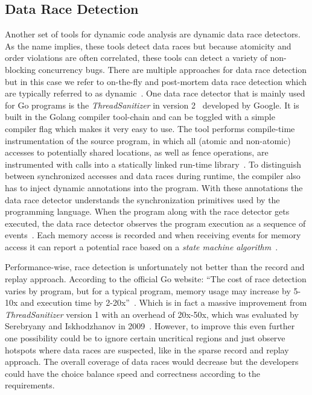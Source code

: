 \documentclass[conference]{IEEEtran}
\begin{document}
\subsection{Data Race Detection}
Another set of tools for dynamic code analysis are dynamic data race detectors.
As the name implies, these tools detect data races but because atomicity and order violations are often correlated, these tools can detect a variety of non-blocking concurrency bugs.
There are multiple approaches for data race detection but in this case we refer to on-the-fly and post-mortem data race detection which are typically referred to as dynamic~\cite{serebry2009threadsanitizer}.
One data race detector that is mainly used for Go programs is the \emph{ThreadSanitizer} in version 2~\cite{threadSanitizer} developed by Google.
It is built in the Golang compiler tool-chain and can be toggled with a simple compiler flag which makes it very easy to use.
The tool performs compile-time instrumentation of the source program, in which all (atomic and non-atomic) accesses to potentially shared locations, as well as fence operations, are instrumented with calls into a statically linked run-time library~\cite{lidbury2019sparse}.
To distinguish between synchronized accesses and data races during runtime, the compiler also has to inject dynamic annotations into the program.
With these annotations the data race detector understands the synchronization primitives used by the programming language.
When the program along with the race detector gets executed, the data race detector observes the program execution as a sequence of events~\cite{serebry2009threadsanitizer}.
Each memory access is recorded and when receiving events for memory access it can report a potential race based on a \emph{state machine algorithm}~\cite{serebry2011llvm}.

Performance-wise, race detection is unfortunately not better than the record and replay approach.
According to the official Go website: ``The cost of race detection varies by program, but for a typical program, memory usage may increase by 5-10x and execution time by 2-20x''~\cite{goRaceDetector}.
Which is in fact a massive improvement from \emph{ThreadSanitizer} version 1 with an overhead of 20x-50x, which was evaluated by Serebryany and Iskhodzhanov in 2009~\cite{serebry2009threadsanitizer}.
However, to improve this even further one possibility could be to ignore certain uncritical regions and just observe hotspots where data races are suspected, like in the sparse record and replay approach.
The overall coverage of data races would decrease but the developers could have the choice balance speed and correctness according to the requirements.
\end{document}
